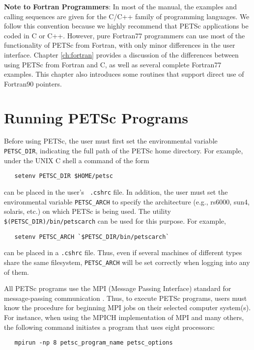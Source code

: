 \medskip \medskip

{\bf Note to Fortran Programmers}: In most of the  
manual, the examples and calling sequences are given for the C/C++
family of programming languages.  We follow this convention because we
highly recommend that PETSc applications be coded in C or C++.
However, pure Fortran77 programmers can use most of the
functionality of PETSc from Fortran, with only minor differences in
the user interface.  Chapter \ref{ch:fortran} provides a discussion of the
differences between using PETSc from Fortran and C, as well as several
complete Fortran77 examples.  This chapter also introduces some
routines that support direct use of Fortran90 pointers.

\section{Running PETSc Programs}
\label{sec:running}

Before using PETSc, the user must first set the environmental variable
{\tt PETSC\_DIR},  indicating the full path of the PETSc home
directory.  For example, under the UNIX C shell a command of the form
\begin{verbatim}
   setenv PETSC_DIR $HOME/petsc
\end{verbatim}
 can be placed in the user's {\tt
.cshrc} file.  In addition, the user must set the environmental
variable {\tt PETSC\_ARCH} to specify the architecture (e.g., rs6000,
sun4, solaris, etc.)  on which PETSc is being used.  The utility {\tt
\$(PETSC\_DIR)/bin/petscarch} can be used for this purpose.  For example,
\begin{verbatim}
   setenv PETSC_ARCH `$PETSC_DIR/bin/petscarch`
\end{verbatim}
can be placed in a {\tt .cshrc} file.  Thus, even if several machines of different
types share the same filesystem, {\tt PETSC\_ARCH} will be set correctly
when logging into any of them. 

All PETSc programs use the MPI (Message Passing Interface) standard
for message-passing communication \cite{MPI-final}.  Thus, to execute
PETSc programs, users must know the procedure for beginning MPI jobs
on their selected computer system(s).  For instance, when using the
MPICH implementation of MPI \cite{mpich-web-page} and many others, the following
command initiates a program that uses eight processors:
  
\begin{verbatim}
   mpirun -np 8 petsc_program_name petsc_options
\end{verbatim}


